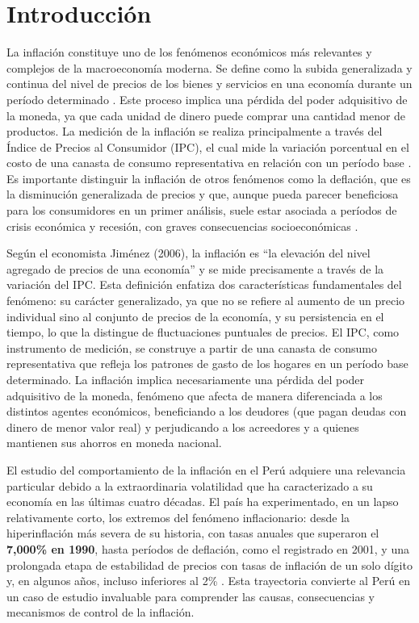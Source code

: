 \documentclass[
  stu,
  floatsintext,
  longtable,
  a4paper,
  nolmodern,
  notxfonts,
  notimes,
  12pt,
  colorlinks=true,linkcolor=blue,citecolor=blue,urlcolor=blue]{apa7}
\begin{document}
\section{Introducción}\label{introducciuxf3n}

La inflación constituye uno de los fenómenos económicos más relevantes y
complejos de la macroeconomía moderna. Se define como la subida
generalizada y continua del nivel de precios de los bienes y servicios
en una economía durante un período determinado . Este proceso implica
una pérdida del poder adquisitivo de la moneda, ya que cada unidad de
dinero puede comprar una cantidad menor de productos. La medición de la
inflación se realiza principalmente a través del Índice de Precios al
Consumidor (IPC), el cual mide la variación porcentual en el costo de
una canasta de consumo representativa en relación con un período base .
Es importante distinguir la inflación de otros fenómenos como la
deflación, que es la disminución generalizada de precios y que, aunque
pueda parecer beneficiosa para los consumidores en un primer análisis,
suele estar asociada a períodos de crisis económica y recesión, con
graves consecuencias socioeconómicas .

Según el economista Jiménez (2006), la inflación es ``la elevación del
nivel agregado de precios de una economía'' y se mide precisamente a
través de la variación del IPC. Esta definición enfatiza dos
características fundamentales del fenómeno: su carácter generalizado, ya
que no se refiere al aumento de un precio individual sino al conjunto de
precios de la economía, y su persistencia en el tiempo, lo que la
distingue de fluctuaciones puntuales de precios. El IPC, como
instrumento de medición, se construye a partir de una canasta de consumo
representativa que refleja los patrones de gasto de los hogares en un
período base determinado. La inflación implica necesariamente una
pérdida del poder adquisitivo de la moneda, fenómeno que afecta de
manera diferenciada a los distintos agentes económicos, beneficiando a
los deudores (que pagan deudas con dinero de menor valor real) y
perjudicando a los acreedores y a quienes mantienen sus ahorros en
moneda nacional.

El estudio del comportamiento de la inflación en el Perú adquiere una
relevancia particular debido a la extraordinaria volatilidad que ha
caracterizado a su economía en las últimas cuatro décadas. El país ha
experimentado, en un lapso relativamente corto, los extremos del
fenómeno inflacionario: desde la hiperinflación más severa de su
historia, con tasas anuales que superaron el \textbf{7,000\% en 1990},
hasta períodos de deflación, como el registrado en 2001, y una
prolongada etapa de estabilidad de precios con tasas de inflación de un
solo dígito y, en algunos años, incluso inferiores al 2\% . Esta
trayectoria convierte al Perú en un caso de estudio invaluable para
comprender las causas, consecuencias y mecanismos de control de la
inflación.
\end{document}
